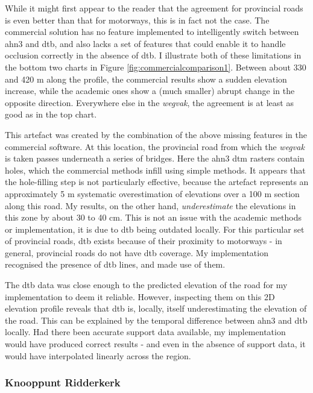 While it might first appear to the reader that the agreement for provincial roads is even better than that for motorways, this is in fact not the case. The commercial solution has no feature implemented to intelligently switch between \ac{ahn3} and \ac{dtb}, and also lacks a set of features that could enable it to handle occlusion correctly in the absence of \ac{dtb}. I illustrate both of these limitations in the bottom two charts in Figure \ref{fig:commercialcomparison1}. Between about 330 and 420 m along the profile, the commercial results show a sudden elevation increase, while the academic ones show a (much smaller) abrupt change in the opposite direction. Everywhere else in the \textit{wegvak}, the agreement is at least as good as in the top chart.

This artefact was created by the combination of the above missing features in the commercial software. At this location, the provincial road from which the \textit{wegvak} is taken passes underneath a series of bridges. Here the \ac{ahn3} \ac{dtm} rasters contain holes, which the commercial methods infill using simple methods. It appears that the hole-filling step is not particularly effective, because the artefact represents an approximately 5 m systematic overestimation of elevations over a 100 m section along this road. My results, on the other hand, \textit{underestimate} the elevations in this zone by about 30 to 40 cm. This is not an issue with the academic methods or implementation, it is due to \ac{dtb} being outdated locally. For this particular set of provincial roads, \ac{dtb} exists because of their proximity to motorways - in general, provincial roads do not have \ac{dtb} coverage. My implementation recognised the presence of \ac{dtb} lines, and made use of them.

The \ac{dtb} data was close enough to the predicted elevation of the road for my implementation to deem it reliable. However, inspecting them on this 2D elevation profile reveals that \ac{dtb} is, locally, itself underestimating the elevation of the road. This can be explained by the temporal difference between \ac{ahn3} and \ac{dtb} locally. Had there been accurate support data available, my implementation would have produced correct results - and even in the absence of support data, it would have interpolated linearly across the region.

\subsubsection{Knooppunt Ridderkerk}

